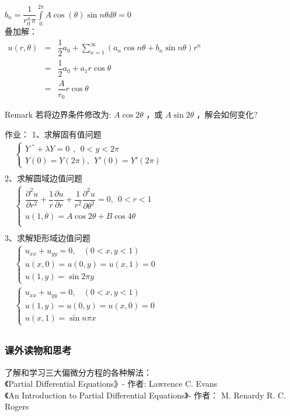 \begin{frame}	
	$  \displaystyle  b_n = \dfrac{1}{r_0 ^n \pi }  \int\limits_{0}^{2\pi} A\cos(\theta) \sin n \theta d\theta =0 $  \\ 
	叠加解：\\
	$\begin{array}{llll}
		u(r, \theta) &=& \dfrac{1}{2} a_0 +\sum\limits_{n=1}^{\infty } (a_n\cos n\theta +b_n \sin n \theta ) r^n \\
		&=& \dfrac{1}{2} a_0+ a_1 r\cos \theta \\
		&=&  \dfrac{A}{r_0} r \cos \theta 
	\end{array}$ \\ 
	\begin{block}{Remark}
		若将边界条件修改为: $A \cos 2\theta$ ，或 $A \sin 2\theta $ ，解会如何变化?
	\end{block}
\end{frame}	

\begin{frame}	
	作业：
	1、求解固有值问题\\ 
	$\begin{array}{lllllllll}
		& \begin{cases}
			Y~^{''} +\lambda Y=0  ~~,~~ 0<y<2\pi \\
			Y(0) =Y(2\pi) , ~~ Y'(0) =Y'(2\pi)
		\end{cases}\\	
	\end{array}$ \\ 
	2、求解圆域边值问题\\
	$\displaystyle  \begin{array}{lllllllll}
	&\begin{cases}
		\dfrac{\partial^2 u }{\partial r^2 } +\dfrac{1}{r } \dfrac{\partial u }{\partial r } +
		\dfrac{1}{r^2 } \dfrac{\partial ^2 u }{\partial \theta ^2  } =0, ~~ 0<r<1\\
		u(1,\theta)= A\cos 2 \theta +B \cos 4 \theta \\	
	\end{cases} \\	
	\end{array}$ \\ 
	3、求解矩形域边值问题\\
	$\begin{array}{lllllllll}
		& \begin{cases}
			u_{xx} +u_{yy} =0 ,~~~~ (0<x, y<1)\\
			u(x,0)= u(0,y)=u(x,1)= 0 \\
			u(1,y)= \sin 2\pi y
		\end{cases}\\	
		&\begin{cases}
			u_{xx} +u_{yy} =0 ,~~~~ (0<x, y<1)\\
			u(1,y)= u(0,y)=u(x,0)= 0 \\
			u(x,1)= \sin n\pi x
		\end{cases} \\	
	\end{array}$ \\ 	
\end{frame}

\begin{frame}
	\frametitle{课外读物和思考}
	了解和学习三大偏微分方程的各种解法：\\
	《Partial Differential Equations》- 作者: Lawrence C. Evans \\
	《An Introduction to Partial Differential Equations》- 作者： M. Renardy R. C. Rogers
\end{frame}
